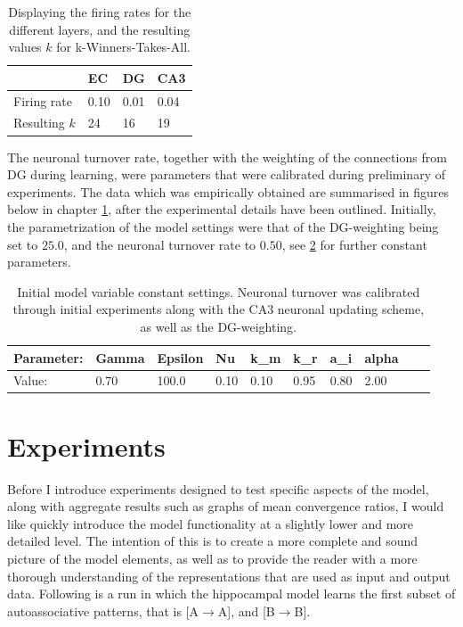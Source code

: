 \begin{table}
\centering
\caption{Displaying the firing rates for the different layers, and the resulting values $k$ for k-Winners-Takes-All.}
\label{table:firing_rates}
\begin{tabular}{l|l|l|l|}
\cline{2-4}
                                  & EC   & DG   & CA3  \\ \hline
\multicolumn{1}{|l|}{Firing rate} & 0.10 & 0.01 & 0.04 \\ \hline
\multicolumn{1}{|l|}{Resulting $k$} & 24 & 16 & 19 \\ \hline
\end{tabular}
\end{table}

The neuronal turnover rate, together with the weighting of the connections from DG during learning, were parameters that were calibrated during preliminary of experiments. The data which was empirically obtained are summarised in figures below in chapter \ref{section:experiments}, after the experimental details have been outlined. Initially, the parametrization of the model settings were that of the DG-weighting being set to $25.0$, and the neuronal turnover rate to $0.50$, see \ref{table:initial_settings} for further constant parameters.

\begin{table}
\centering
\caption{Initial model variable constant settings. Neuronal turnover was calibrated through initial experiments along with the CA3 neuronal updating scheme, as well as the DG-weighting.}
\label{table:initial_settings}
\begin{tabular}{|l|l|l|l|l|l|l|l|l|l|}
\cline{1-8}
Parameter: & Gamma & Epsilon & Nu   & k\_m & k\_r & a\_i & alpha \\ \hline
Value:     & 0.70  & 100.0   & 0.10 & 0.10 & 0.95 & 0.80 & 2.00 \\ \hline
\end{tabular}
\end{table}


\section{Experiments}\label{section:experiments}

Before I introduce experiments designed to test specific aspects of the model, along with aggregate results such as graphs of mean convergence ratios, I would like quickly introduce the model functionality at a slightly lower and more detailed level. The intention of this is to create a more complete and sound picture of the model elements, as well as to provide the reader with a more thorough understanding of the representations that are used as input and output data. Following is a run in which the hippocampal model learns the first subset of autoassociative patterns, that is [A$\rightarrow$A], and [B$\rightarrow$B].

